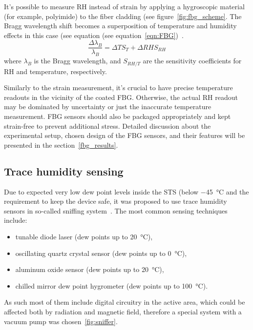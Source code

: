 It's possible to measure RH instead of strain by applying a hygroscopic material (for example, polyimide) to the fiber cladding (see figure~\ref{fig:fbg_scheme}. The  Bragg wavelength shift becomes a superposition of temperature and humidity effects in this case (see equation (see equation~\ref{eqn:FBG})~\cite{Kronenberg:02, YEO2008280}. 
                             \begin{equation}\label{eqn:FBG}
                                    \frac{\Delta\lambda_{B}}{\lambda_{B}}=\Delta TS_{T}+\Delta RHS_{RH}
                            \end{equation}
                            where $\lambda_{B}$ is the Bragg wavelength, and $S_{RH/T}$ are the sensitivity coefficients for RH and temperature, respectively. 

Similarly to the strain measurement, it’s crucial to have precise temperature readouts in the vicinity of the coated \gls{FBG}. Otherwise, the actual RH readout may be dominated by uncertainty or just the inaccurate temperature measurement. \gls{FBG} sensors should also be packaged appropriately and kept strain-free to prevent additional stress. Detailed discussion about the experimental setup, chosen design of the \gls{FBG} sensors, and their features will be presented in the section~\ref{fbg_results}.



\subsection{Trace humidity sensing}
Due to expected very low dew point levels inside the \gls{STS} (below \SI{-45}{\celsius} and the requirement to keep the device safe, it was proposed to use trace humidity sensors in so-called sniffing system~\cite{Berruti}.
The most common sensing techniques include:
\begin{itemize}
    \item tunable diode laser (dew points up to \SI{20}{\celsius}),
    \item oscillating quartz crystal sensor (dew points up to \SI{0}{\celsius}),
    \item aluminum oxide sensor (dew points up to \SI{20}{\celsius}),
    \item chilled mirror dew point hygrometer  (dew points up to \SI{100}{\celsius}).
\end{itemize}
As such most of them include digital circuitry in the active area, which could be affected both by radiation and magnetic field, therefore a special system with a vacuum pump was chosen~\ref{fig:sniffer}. 

